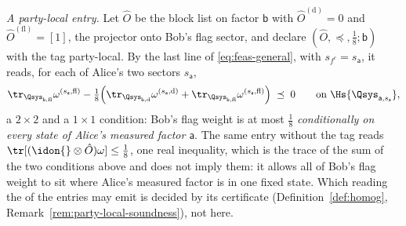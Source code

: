 \begin{example}
\emph{A party-local entry.} Let $\hat O$ be the block list on factor
$\mathsf b$ with $\hat O^{(\mathrm d)}=0$ and $\hat O^{(\mathrm{fl})}=[1]$,
the projector onto Bob's flag sector, and declare
$(\hat O,\preceq,\tfrac18;\mathsf b)$ with the tag party-local. By the last
line of \eqref{eq:feas-general}, with $s_{f^c}=s_{\mathsf a}$, it reads, for
each of Alice's two sectors $s_{\mathsf a}$,
\begin{equation*}
  \tr_{\Qsys_{\mathsf b,\mathrm{fl}}}\omega^{(s_{\mathsf a},\mathrm{fl})}
  -\tfrac18\Big(\tr_{\Qsys_{\mathsf b,\mathrm d}}
  \omega^{(s_{\mathsf a},\mathrm d)}
  +\tr_{\Qsys_{\mathsf b,\mathrm{fl}}}\omega^{(s_{\mathsf a},\mathrm{fl})}\Big)
  \;\preceq\;0
  \qquad\text{on }\Hs{\Qsys_{\mathsf a,s_{\mathsf a}}} ,
\end{equation*}
a $2\times2$ and a $1\times1$ condition: Bob's flag weight is at most
$\tfrac18$ \emph{conditionally on every state of Alice's measured factor
$\mathsf a$}. The same
entry without the tag reads
$\tr[(\idon{}\otimes\hat O)\omega]\le\tfrac18$, one real inequality, which is
the trace of the sum of the two conditions above and does not imply them: it
allows all of Bob's flag weight to sit where Alice's measured factor is in
one fixed state. Which reading the  of the entries may emit is decided by
its certificate (Definition~\ref{def:homog},
Remark~\ref{rem:party-local-soundness}), not here.
\end{example}
